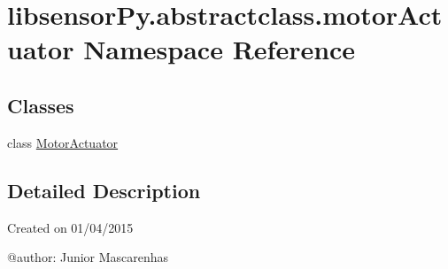 \hypertarget{namespacelibsensorPy_1_1abstractclass_1_1motorActuator}{}\section{libsensor\+Py.\+abstractclass.\+motor\+Actuator Namespace Reference}
\label{namespacelibsensorPy_1_1abstractclass_1_1motorActuator}
\subsection*{Classes}
\begin{DoxyCompactItemize}
\item 
class \hyperlink{classlibsensorPy_1_1abstractclass_1_1motorActuator_1_1MotorActuator}{Motor\+Actuator}
\end{DoxyCompactItemize}


\subsection{Detailed Description}
\begin{DoxyVerb}Created on 01/04/2015

@author: Junior Mascarenhas
\end{DoxyVerb}
 